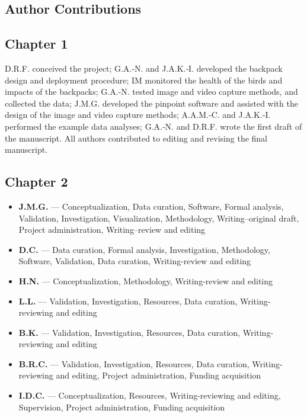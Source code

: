 \documentclass[11pt,a4paper,twoside]{book}
\begin{document}
\begin{doublespace}
\chapter*{Author Contributions}

\section*{Chapter 1}
D.R.F. conceived the project; G.A.‐N. and J.A.K.‐I. developed the backpack design and deployment procedure; IM monitored the health of the birds and impacts of the backpacks; G.A.‐N. tested image and video capture methods, and collected the data; J.M.G. developed the pinpoint software and assisted with the design of the image and video capture methods; A.A.M.‐C. and J.A.K.‐I. performed the example data analyses; G.A.‐N. and D.R.F. wrote the first draft of the manuscript. All authors contributed to editing and revising the final manuscript.

\section*{Chapter 2}
\begin{itemize}
\item \textbf{J.M.G.} --- Conceptualization, Data curation, Software, Formal analysis, Validation, Investigation, Visualization, Methodology, Writing--original draft, Project administration, Writing--review and editing
\item \textbf{D.C.} --- Data curation, Formal analysis, Investigation, Methodology, Software, Validation, Data curation, Writing-review and editing
\item \textbf{H.N.} --- Conceptualization, Methodology, Writing-review and editing
\item \textbf{L.L.} --- Validation, Investigation, Resources, Data curation, Writing-reviewing and editing
\item \textbf{B.K.} --- Validation, Investigation, Resources, Data curation, Writing-reviewing and editing
\item \textbf{B.R.C.} --- Validation, Investigation, Resources, Data curation, Writing-reviewing and editing, Project administration, Funding acquisition
\item \textbf{I.D.C.} --- Conceptualization, Resources, Writing-reviewing and editing, Supervision, Project administration, Funding acquisition
\end{itemize}


\end{doublespace}
\end{document}
